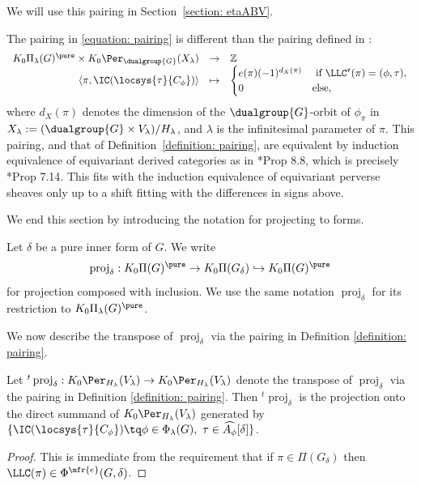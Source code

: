 \documentclass[11pt,letterpaper]{amsart}
\numberwithin{equation}{section}
\begin{document}
We will use this pairing in Section~\ref{section: etaABV}.

\begin{remark}\label{remark: equivalence of pairings}
    The pairing in \eqref{equation: pairing} is different than the pairing defined in \cite{Vog93}:
    \[
    \begin{array}{rcl}
        K_0\Pi_\lambda(G)^\pure \times K_0\Per_{\dualgroup{G}}(X_\lambda)
            &\to& \mathbb{Z}\\
        \langle \pi, \IC(\locsys{\tau}{C_\phi}) \rangle 
            &\mapsto& 
            \begin{cases}
                e(\pi)(-1)^{d_X(\pi)} & \text{ if }\LLC^\mathfrak{e}(\pi) = (\phi,\tau), \\
                0 & \text{else},
            \end{cases}
    \end{array}
\]
where $d_X(\pi)$ denotes the dimension of the $\dualgroup{G}$-orbit of $\phi_\pi$ in $X_\lambda := (\dualgroup{G}\times V_\lambda)/H_\lambda$, and $\lambda$ is the infinitesimal parameter of $\pi$.
This pairing, and that of Definition~\ref{definition: pairing}, are equivalent by
induction equivalence of equivariant derived categories as in \cite{Vog93}*{Prop 8.8}, which is precisely \cite{ABV92}*{Prop 7.14}. This fits with the induction equivalence of equivariant perverse sheaves only up to a shift fitting with the differences in signs above.
\end{remark}

We end this section by introducing the notation for projecting to forms.

\begin{definition}\label{def project to form}
Let $\delta$ be a pure inner form of $G$. We write
\[\operatorname{proj}_{\delta}: K_{0}\Pi(G)^\pure \to K_{0}\Pi(G_{\delta}) \hookrightarrow K_{0}\Pi(G)^\pure\]
for projection composed with inclusion. We use the same notation 
$\operatorname{proj}_{\delta}$ for its restriction to $K_{0}\Pi_{\lambda}(G)^\pure$.
\end{definition}

We now describe the transpose of $\operatorname{proj}_{\delta}$  via the pairing in Definition \ref{definition: pairing}.



\begin{lemma}\label{lem: transpose of projection IC}
   Let ${}^t \operatorname{proj}_{\delta}: K_{0}\Per_{H_{\lambda}}(V_{\lambda}) \to K_{0}\Per_{H_{\lambda}}(V_{\lambda})$ denote the transpose of $\operatorname{proj}_{\delta}$ via the pairing in Definition \ref{definition: pairing}. Then ${}^t \operatorname{proj}_{\delta}$ is the projection onto the direct summand of $K_{0}\Per_{H_{\lambda}}(V_{\lambda}) $ generated by
   $ \{\IC(\locsys{\tau}{C_{\phi}} ) \tq \phi\in \Phi_{\lambda}(G), \ \tau \in \widehat{A_{\phi}}[\delta]\}$.
\end{lemma}
\begin{proof}
    This is immediate from the requirement that if $\pi \in \Pi(G_{\delta})$ then $\LLC(\pi) \in \Phi^{\mfr{e}}(G,\delta)$.
\end{proof}
\end{document}
